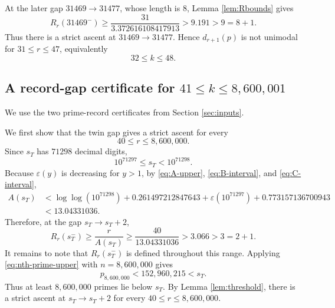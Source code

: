 \documentclass[11pt]{article}
\numberwithin{equation}{section}
\theoremstyle{plain}
\theoremstyle{definition}
\theoremstyle{remark}
\newcommand{\eps}{\varepsilon}
\begin{document}
At the later gap \(31469\to31477\), whose length is \(8\), Lemma \ref{lem:Rbounds} gives
\[
        R_r(31469^-)
        \ge
        \frac{31}{3.372616108417913}
        >9.191>9=8+1.
\]
Thus there is a strict ascent at \(31469\to31477\).  Hence \(d_{r+1}(p)\) is not unimodal for \(31\le r\le47\), equivalently
\[
        32\le k\le 48.
\]

\subsection{A record-gap certificate for \texorpdfstring{\(41\le k\le8{,}600{,}001\)}{41 <= k <= 8,600,001}}
\label{sec:finite-large}

We use the two prime-record certificates from Section \ref{sec:inputs}.

We first show that the twin gap gives a strict ascent for every
\[
        40\le r\le8{,}600{,}000.
\]
Since \(s_T\) has \(71298\) decimal digits,
\[
        10^{71297}\le s_T<10^{71298}.
\]
Because \(\eps(y)\) is decreasing for \(y>1\), by \eqref{eq:A-upper}, \eqref{eq:B-interval}, and \eqref{eq:C-interval},
\[
\begin{aligned}
        A(s_T)
        &<
        \log\log(10^{71298})
        +0.261497212847643
        +\eps(10^{71297})
        +0.773157136700943  \\
        &<13.04331036.
\end{aligned}
\]
Therefore, at the gap \(s_T\to s_T+2\),
\[
        R_r(s_T^-)
        \ge
        \frac r{A(s_T)}
        \ge
        \frac{40}{13.04331036}
        >3.066>3=2+1.
\]
It remains to note that \(R_r(s_T^-)\) is defined throughout this range. Applying \eqref{eq:nth-prime-upper} with \(n=8{,}600{,}000\) gives
\[
        p_{8{,}600{,}000}<152{,}960{,}215<s_T.
\]
Thus at least \(8{,}600{,}000\) primes lie below \(s_T\). By Lemma \ref{lem:threshold}, there is a strict ascent at \(s_T\to s_T+2\) for every \(40\le r\le8{,}600{,}000\).
\end{document}
